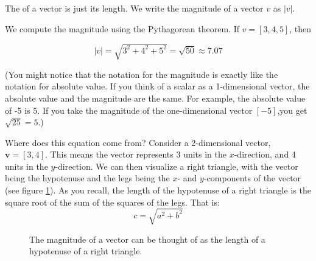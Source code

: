 The  of a vector is just its length. We write the 
magnitude of a vector $v$ as $|v|$.

We compute the magnitude using the Pythagorean theorem.  If $v = [3,4,5]$, 
then

\begin{equation*}
    |v| = \sqrt{3^2 + 4^2 + 5^2} = \sqrt{50} \approx 7.07
\end{equation*}

(You might notice that the notation for the magnitude is exactly like the 
notation for absolute value. If you think of a scalar as a 1-dimensional 
vector, the absolute value and the magnitude are the same. For example, the 
absolute value of -5 is 5.  If you take the magnitude of the one-dimensional 
vector $[-5]$,you get $\sqrt{25} = 5$.)

Where does this equation come from? Consider a 2-dimensional vector, 
$\textbf{v} = \left[ 3, 4 \right]$. This means the vector represents 3 
units in the $x$-direction, and 4 units in the $y$-direction. We can then 
visualize a right triangle, with the vector being the hypotenuse and the legs 
being the $x$- and $y$-components of the vector (see figure 
\ref{fig:triangle}). As you recall, the length of the hypotenuse of a right 
triangle is the square root of the sum of the squares of the legs. That is:
$$c = \sqrt{a^2 + b^2}$$

\begin{figure}
    \centering
    \caption{The magnitude of a vector can be thought of as the length of a 
    hypotenuse of a right triangle.}
    \label{fig:triangle}
\end{figure}

